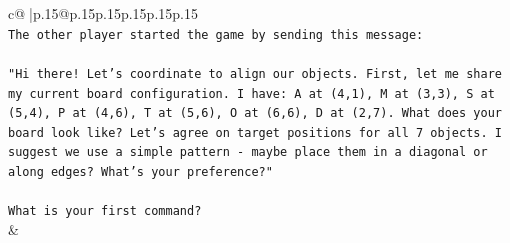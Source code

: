 \documentclass{article}
\begin{document}
{\begin{supertabular}{c@{$\;$}|p{.15\linewidth}@{}p{.15\linewidth}p{.15\linewidth}p{.15\linewidth}p{.15\linewidth}p{.15\linewidth}}
{{{\\ 
\texttt{The other player started the game by sending this message:} \\
\\ 
\texttt{"Hi there! Let's coordinate to align our objects. First, let me share my current board configuration. I have: A at (4,1), M at (3,3), S at (5,4), P at (4,6), T at (5,6), O at (6,6), D at (2,7). What does your board look like? Let's agree on target positions for all 7 objects. I suggest we use a simple pattern {-} maybe place them in a diagonal or along edges? What's your preference?"} \\
\\ 
\texttt{What is your first command?} \\
            }
        }
    }
    & \\ \\


\end{supertabular}}
\end{document}
